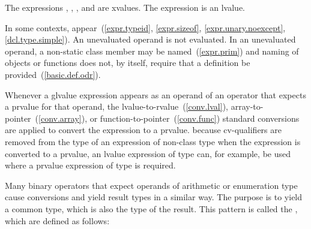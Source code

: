 The expressions , , , and 
are xvalues. The expression  is an lvalue.
\exitexample

\pnum
In some contexts, 
appear~(\ref{expr.typeid}, \ref{expr.sizeof}, \ref{expr.unary.noexcept}, \ref{dcl.type.simple}).
An unevaluated operand is not evaluated.
\enternote
In an unevaluated operand, a non-static class member may be
named~(\ref{expr.prim}) and naming of objects or functions does not, by
itself, require that a definition be provided~(\ref{basic.def.odr}).
\exitnote

\pnum
Whenever a glvalue expression appears as an operand of an operator that
expects a prvalue for that operand, the
lvalue-to-rvalue~(\ref{conv.lval}), array-to-pointer~(\ref{conv.array}),
or function-to-pointer~(\ref{conv.func}) standard conversions are
applied to convert the expression to a prvalue.
\enternote 
because cv-qualifiers are removed from the type of an expression of
non-class type when the expression is converted to a prvalue, an lvalue
expression of type  can, for example, be used where
a prvalue expression of type  is required.
\exitnote 

\pnum
{}%
Many binary operators that expect operands of arithmetic or enumeration
type cause conversions and yield result types in a similar way. The
purpose is to yield a common type, which is also the type of the result.
This pattern is called the ,
which are defined as follows:

